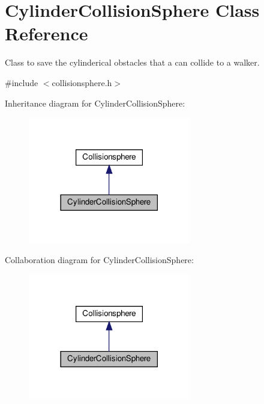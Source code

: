 \hypertarget{class_cylinder_collision_sphere}{}\section{Cylinder\+Collision\+Sphere Class Reference}
\label{class_cylinder_collision_sphere}


Class to save the cylinderical obstacles that a can collide to a walker.  




{\ttfamily \#include $<$collisionsphere.\+h$>$}



Inheritance diagram for Cylinder\+Collision\+Sphere\+:\nopagebreak
\begin{figure}[H]
\begin{center}
\leavevmode
\includegraphics[width=201pt]{class_cylinder_collision_sphere__inherit__graph}
\end{center}
\end{figure}


Collaboration diagram for Cylinder\+Collision\+Sphere\+:\nopagebreak
\begin{figure}[H]
\begin{center}
\leavevmode
\includegraphics[width=201pt]{class_cylinder_collision_sphere__coll__graph}
\end{center}
\end{figure}
